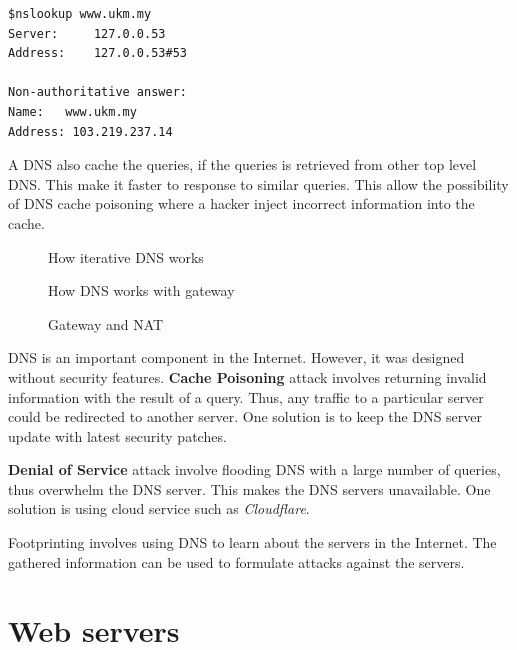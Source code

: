 \documentclass[7x9]{times}
\begin{document}
\begin{verbatim}
$nslookup www.ukm.my
Server:		127.0.0.53
Address:	127.0.0.53#53

Non-authoritative answer:
Name:	www.ukm.my
Address: 103.219.237.14
\end{verbatim}

A DNS also cache the queries, if the queries is retrieved
from other top level DNS\@. This make it faster to response to
similar queries. This allow the possibility of DNS cache
poisoning where a hacker inject incorrect information into
the cache.

\begin{figure}[ht]
    \centering
    \def\svgwidth{.85\textwidth}
    
    \caption{How iterative DNS works}
\end{figure}

\begin{figure}[ht]
    \centering
    \def\svgwidth{.85\textwidth}
    
    \caption{How DNS works with gateway}
\end{figure}

\begin{figure}[ht]
    \centering
    \def\svgwidth{.85\textwidth}
    
    \caption{Gateway and NAT}
\end{figure}

DNS is an important component in the Internet. However, it
was designed without security features. \textbf{Cache
    Poisoning} attack involves returning invalid information
with the result of a query. Thus, any traffic to a
particular server could be redirected to another server. 
One solution is to keep the DNS server update with latest 
security patches.

\textbf{Denial of Service} attack involve flooding DNS with
a large number of queries, thus overwhelm the DNS server.
This  makes the DNS servers unavailable. One solution is 
using cloud service such as \textit{Cloudflare}.

Footprinting involves using DNS  to learn about the servers
in the Internet. The gathered information can be used to 
formulate attacks against the servers.








\section{Web servers}
\end{document}
